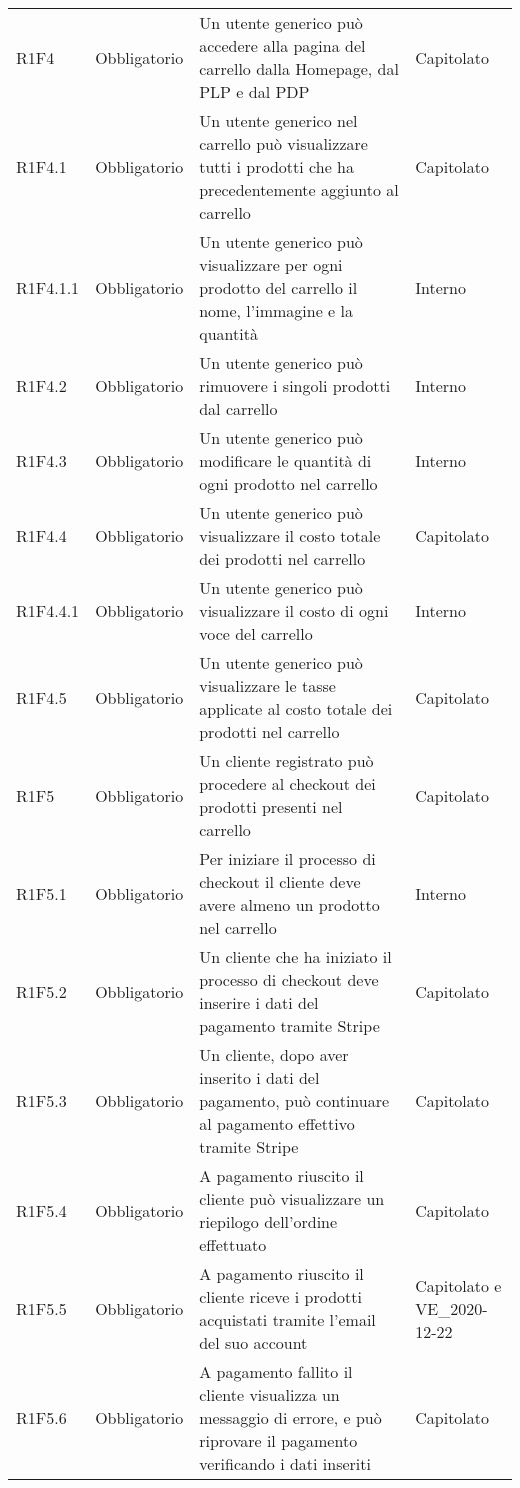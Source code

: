 {\begin{longtable}{C{2.5cm} C{2.8cm} C{6.7cm} C{2.5cm}}
R1F4 & Obbligatorio & Un utente generico può accedere alla pagina del carrello dalla Homepage, dal PLP e dal PDP & Capitolato \\
R1F4.1 & Obbligatorio & Un utente generico nel carrello può visualizzare tutti i prodotti che ha precedentemente aggiunto al carrello & Capitolato \\
R1F4.1.1 & Obbligatorio & Un utente generico può visualizzare per ogni prodotto del carrello il nome, l'immagine e la quantità & Interno \\
R1F4.2 & Obbligatorio & Un utente generico può rimuovere i singoli prodotti dal carrello & Interno \\
R1F4.3 & Obbligatorio & Un utente generico può modificare le quantità di ogni prodotto nel carrello & Interno \\
R1F4.4 & Obbligatorio & Un utente generico può visualizzare il costo totale dei prodotti nel carrello & Capitolato \\
R1F4.4.1 & Obbligatorio & Un utente generico può visualizzare il costo di ogni voce del carrello & Interno \\
R1F4.5 & Obbligatorio & Un utente generico può visualizzare le tasse applicate al costo totale dei prodotti nel carrello & Capitolato \\


R1F5 & Obbligatorio & Un cliente registrato può procedere al checkout dei prodotti presenti nel carrello & Capitolato \\
R1F5.1 & Obbligatorio & Per iniziare il processo di checkout il cliente deve avere almeno un prodotto nel carrello & Interno \\
R1F5.2 & Obbligatorio & Un cliente che ha iniziato il processo di checkout deve inserire i dati del pagamento tramite Stripe & Capitolato \\
R1F5.3 & Obbligatorio & Un cliente, dopo aver inserito i dati del pagamento, può continuare al pagamento effettivo tramite Stripe & Capitolato \\
R1F5.4 & Obbligatorio & A pagamento riuscito il cliente può visualizzare un riepilogo dell'ordine effettuato & Capitolato \\
R1F5.5 & Obbligatorio & A pagamento riuscito il cliente riceve i prodotti acquistati tramite l'email del suo account & Capitolato e VE\_2020-12-22 \\
R1F5.6 & Obbligatorio & A pagamento fallito il cliente visualizza un messaggio di errore, e può riprovare il pagamento verificando i dati inseriti & Capitolato \\


\end{longtable}}
